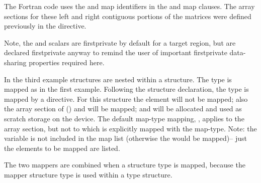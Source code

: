 The Fortran code uses the  and  map identifiers in the
 and  map clauses.  
The array sections for these left and right contiguous portions of the matrices 
were defined previously in the  directive.

Note, the  and  scalars are firstprivate 
by default for a target region, but are declared firstprivate anyway
to remind the user of important firstprivate data-sharing properties required here.



In the third example  structures are
nested within a  structure. The  type is mapped
as in the first example.  Following the  structure declaration, 
the  type is mapped by a  directive. 
For this structure the  element will not be mapped;
also the array section of  () and  will be mapped; and
 will be allocated and used as scratch storage on the device.
The default map-type mapping, , applies to the  array section,
but not to  which is explicitly mapped with the  map-type. 
Note: the variable  is not included in the map list (otherwise
the  would be mapped)-- just the elements 
to be mapped are listed.

The two mappers are combined when a  structure type is mapped,
because the mapper  structure type is used within a 
type structure.



